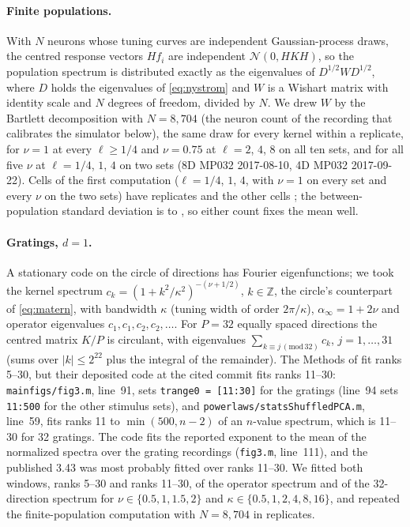 \documentclass[11pt]{article}
\theoremstyle{definition}
\begin{document}
\paragraph{Finite populations.} With $N$ neurons whose tuning curves are independent Gaussian-process draws, the centred response vectors $Hf_i$ are independent $\mathcal{N}(0, HKH)$, so the population spectrum is distributed exactly as the eigenvalues of $D^{1/2} W D^{1/2}$, where $D$ holds the eigenvalues of \eqref{eq:nystrom} and $W$ is a Wishart matrix with identity scale and $N$ degrees of freedom, divided by $N$. We drew $W$ by the Bartlett decomposition with $N = 8{,}704$ (the neuron count of the recording that calibrates the simulator below), the same draw for every kernel within a replicate, for $\nu = 1$ at every $\ell \ge 1/4$ and $\nu = 0.75$ at $\ell = 2$, $4$, $8$ on all ten sets, and for all five $\nu$ at $\ell = 1/4$, $1$, $4$ on two sets (8D MP032 2017-08-10, 4D MP032 2017-09-22). Cells of the first computation ($\ell = 1/4$, $1$, $4$, with $\nu = 1$ on every set and every $\nu$ on the two sets) have \FinRFirst{} replicates and the other cells \FinRAdded{}; the between-population standard deviation is \FinSDMin{} to \FinSDMax{}, so either count fixes the mean well.

\paragraph{Gratings, \texorpdfstring{$d = 1$}{d = 1}.} A stationary code on the circle of directions has Fourier eigenfunctions; we took the kernel spectrum $c_k = (1 + k^2/\kappa^2)^{-(\nu + 1/2)}$, $k \in \mathbb{Z}$, the circle's counterpart of \eqref{eq:matern}, with bandwidth $\kappa$ (tuning width of order $2\pi/\kappa$), $\alpha_\infty = 1 + 2\nu$ and operator eigenvalues $c_1, c_1, c_2, c_2, \dots$. For $P = 32$ equally spaced directions the centred matrix $K/P$ is circulant, with eigenvalues $\sum_{k \equiv j \,(\mathrm{mod}\, 32)} c_k$, $j = 1, \dots, 31$ (sums over $|k| \le 2^{22}$ plus the integral of the remainder). The Methods of \cite{stringer2019} fit ranks 5--30, but their deposited code at the cited commit fits ranks 11--30: \texttt{mainfigs/fig3.m}, line~91, sets \texttt{trange0 = [11:30]} for the gratings (line~94 sets \texttt{11:500} for the other stimulus sets), and \texttt{powerlaws/statsShuffledPCA.m}, line~59, fits ranks 11 to $\min(500, n - 2)$ of an $n$-value spectrum, which is 11--30 for 32 gratings. The code fits the reported exponent to the mean of the normalized spectra over the grating recordings (\texttt{fig3.m}, line~111), and the published 3.43 was most probably fitted over ranks 11--30. We fitted both windows, ranks 5--30 and ranks 11--30, of the operator spectrum and of the 32-direction spectrum for $\nu \in \{0.5, 1, 1.5, 2\}$ and $\kappa \in \{0.5, 1, 2, 4, 8, 16\}$, and repeated the finite-population computation with $N = 8{,}704$ in \GratR{} replicates.
\end{document}
